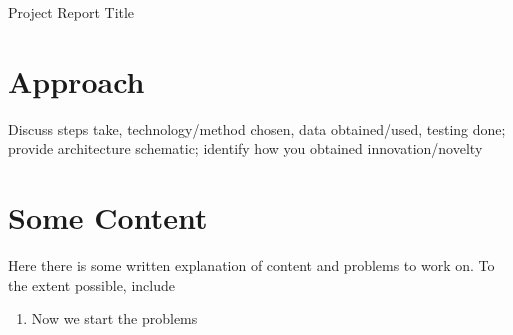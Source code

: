 \documentclass{tufte-handout}
\author{Day X: Catchy Title}
\date{*CLASS DATE*}
\begin{document}
\vspace{0.1in}
Project Report Title



\section{Approach} Discuss steps take, technology/method chosen, data obtained/used, testing done; provide architecture schematic; identify how you obtained innovation/novelty







\section{Some Content}

Here there is some written explanation of content and problems to work on. To the extent possible, include

\begin{enumerate}
\item Now we start the problems
\end{enumerate}
\end{document}
